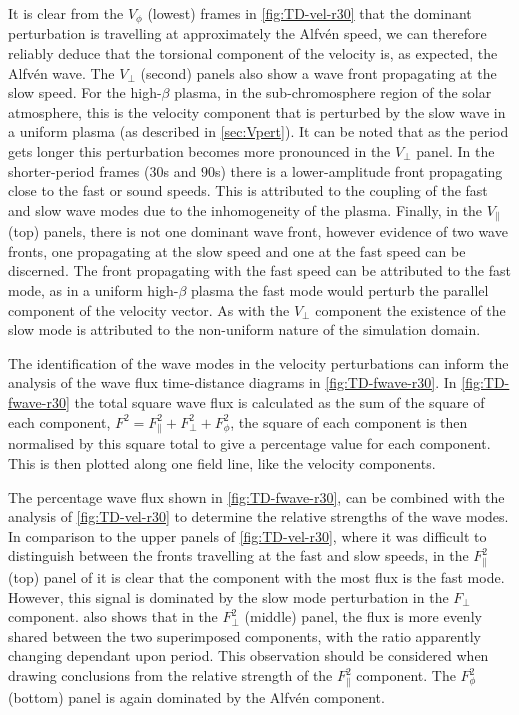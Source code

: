 \documentclass[a4paper,12pt,fourier,authoryear,custommargin]{Classes/PhDThesisPSnPDF}
\begin{document}
It is clear from the $V_\phi$ (lowest) frames in \cref{fig:TD-vel-r30} that the dominant perturbation is travelling at approximately the Alfv\'en speed, we can therefore reliably deduce that the torsional component of the velocity is, as expected, the Alfv\'en wave.
The $V_\perp$ (second) panels also show a wave front propagating at the slow speed. For the high-$\beta$ plasma, in the sub-chromosphere region of the solar atmosphere, this is the velocity component that is perturbed by the slow wave in a uniform plasma (as described in \cref{sec:Vpert}).
It can be noted that as the period gets longer this perturbation becomes more pronounced in the $V_\perp$ panel.
In the shorter-period frames ($30$s and $90$s) there is a lower-amplitude front propagating close to the fast or sound speeds.
This is attributed to the coupling of the fast and slow wave modes due to the inhomogeneity of the plasma.
Finally, in the $V_\parallel$ (top) panels, there is not one dominant wave front, however evidence of two wave fronts, one propagating at the slow speed and one at the fast speed can be discerned.
The front propagating with the fast speed can be attributed to the fast mode, as in a uniform high-$\beta$ plasma the fast mode would perturb the parallel component of the velocity vector.
As with the $V_\perp$ component the existence of the slow mode is attributed to the non-uniform nature of the simulation domain.


The identification of the wave modes in the velocity perturbations can inform the analysis of the wave flux time-distance diagrams in \cref{fig:TD-fwave-r30}.
In \cref{fig:TD-fwave-r30} the total square wave flux is calculated as the sum of the square of each component, $ F^2 = F_\parallel^2 + F_\perp ^2  + F_\phi^2$, the square of each component is then normalised by this square total to give a percentage value for each component.
This is then plotted along one field line, like the velocity components.


The percentage wave flux shown in \cref{fig:TD-fwave-r30}, can be combined with the analysis of \cref{fig:TD-vel-r30} to determine the relative strengths of the wave modes.
In comparison to the upper panels of \cref{fig:TD-vel-r30}, where it was difficult to distinguish between the fronts travelling at the fast and slow speeds, in the $F^2_\parallel$ (top) panel of  it is clear that the component with the most flux is the fast mode.
However, this signal is dominated by the slow mode perturbation in the $F_\perp$ component.
 also shows that in the $F^2_\perp$ (middle) panel, the flux is more evenly shared between the two superimposed components, with the ratio apparently changing dependant upon period.
This observation should be considered when drawing conclusions from the relative strength of the $F^2_\parallel$ component.
The $F^2_\phi$ (bottom) panel is again dominated by the Alfv\'en component.
\end{document}
